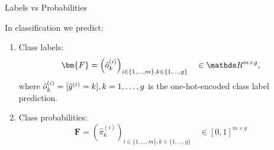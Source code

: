 \documentclass[11pt,compress,t,notes=noshow, xcolor=table]{beamer}
\begin{document}


\begin{vbframe}{Labels vs Probabilities}

\footnotesize

In classification we predict:

\begin{enumerate}
  \item Class labels: \\
  $$\bm{F} = \left( \hat{o}_k^{(i)} \right)_{i \in \{1, \dots, m\}, 
  k \in \{1, \dots, g\}}
  \quad \in \R^{m \times g},$$
  where $\hat{o}_k^{(i)} = [\hat{y}^{(i)} = k], k = 1, \dots, g$ is the one-hot-encoded 
  class label prediction.
  \item Class probabilities: \\
  $$\bm{F} = \left(\hat{\pi}_k^{(i)} \right)_{i \in \{1, \dots, m\}, 
  k \in \{1, \dots, g\}}
  \quad \in [0, 1]^{m \times g}$$
\end{enumerate}


\end{vbframe}
\end{document}
